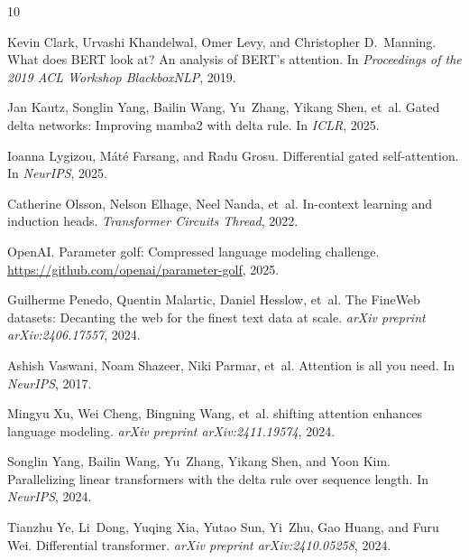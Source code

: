 \documentclass[11pt]{article}
\begin{document}

\begin{thebibliography}{10}

Kevin Clark, Urvashi Khandelwal, Omer Levy, and Christopher D.\ Manning.
\newblock What does {BERT} look at? {A}n analysis of {BERT}'s attention.
\newblock In \emph{Proceedings of the 2019 ACL Workshop BlackboxNLP}, 2019.

Jan Kautz, Songlin Yang, Bailin Wang, Yu~Zhang, Yikang Shen, et~al.
\newblock Gated delta networks: Improving mamba2 with delta rule.
\newblock In \emph{ICLR}, 2025.

Ioanna Lygizou, M\'at\'e Farsang, and Radu Grosu.
\newblock Differential gated self-attention.
\newblock In \emph{NeurIPS}, 2025.

Catherine Olsson, Nelson Elhage, Neel Nanda, et~al.
\newblock In-context learning and induction heads.
\newblock \emph{Transformer Circuits Thread}, 2022.

OpenAI.
\newblock Parameter golf: Compressed language modeling challenge.
\newblock \url{https://github.com/openai/parameter-golf}, 2025.

Guilherme Penedo, Quentin Malartic, Daniel Hesslow, et~al.
\newblock The {FineWeb} datasets: Decanting the web for the finest text data at scale.
\newblock \emph{arXiv preprint arXiv:2406.17557}, 2024.

Ashish Vaswani, Noam Shazeer, Niki Parmar, et~al.
\newblock Attention is all you need.
\newblock In \emph{NeurIPS}, 2017.

Mingyu Xu, Wei Cheng, Bingning Wang, et~al.
 shifting attention enhances language modeling.
\newblock \emph{arXiv preprint arXiv:2411.19574}, 2024.

Songlin Yang, Bailin Wang, Yu~Zhang, Yikang Shen, and Yoon Kim.
\newblock Parallelizing linear transformers with the delta rule over sequence length.
\newblock In \emph{NeurIPS}, 2024.

Tianzhu Ye, Li~Dong, Yuqing Xia, Yutao Sun, Yi~Zhu, Gao Huang, and Furu Wei.
\newblock Differential transformer.
\newblock \emph{arXiv preprint arXiv:2410.05258}, 2024.


\end{thebibliography}
\end{document}
